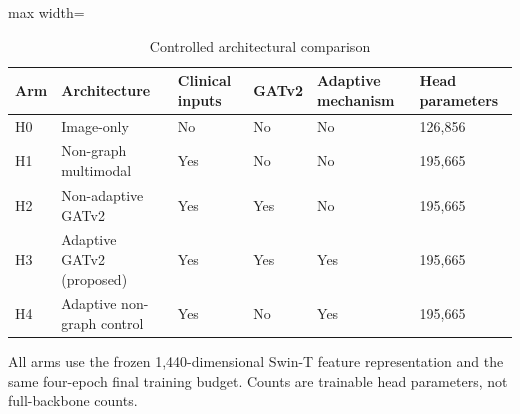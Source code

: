 \begin{table}[t]
\centering
\small
\caption{Controlled architectural comparison}
\label{tab:03-ablation-design}
\begin{adjustbox}{max width=\textwidth}
\begin{tabular}{llllll}
\toprule
\textbf{Arm} & \textbf{Architecture} & \textbf{Clinical inputs} & \textbf{GATv2} & \textbf{Adaptive mechanism} & \textbf{Head parameters} \\
\midrule
H0 & Image-only & No & No & No & 126,856 \\
H1 & Non-graph multimodal & Yes & No & No & 195,665 \\
H2 & Non-adaptive GATv2 & Yes & Yes & No & 195,665 \\
H3 & Adaptive GATv2 (proposed) & Yes & Yes & Yes & 195,665 \\
H4 & Adaptive non-graph control & Yes & No & Yes & 195,665 \\
\bottomrule
\end{tabular}
\end{adjustbox}
\par\smallskip
\begin{minipage}{\textwidth}\footnotesize All arms use the frozen 1,440-dimensional Swin-T feature representation and the same four-epoch final training budget. Counts are trainable head parameters, not full-backbone counts.\end{minipage}
\end{table}

